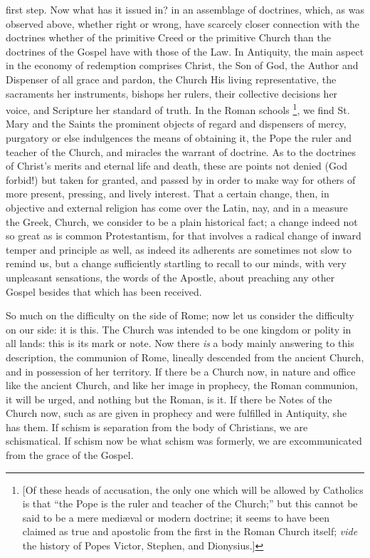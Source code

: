 first step. Now what has it issued in? in an assemblage of doctrines,
which, as was observed above, whether right or wrong, have scarcely
closer connection with the doctrines whether of the primitive Creed or
the primitive Church than the doctrines of the Gospel have with those
of the Law. In Antiquity, the main aspect in the economy of redemption
comprises Christ, the Son of God, the Author and Dispenser of all
grace and pardon, the Church His living representative, the sacraments
her instruments, bishops her rulers, their collective decisions her
voice, and Scripture her standard of truth. In the Roman schools \footnote{[Of these heads of accusation, the only one which will be allowed by
Catholics is that ``the Pope is the ruler and teacher of the Church;''
but this cannot be said to be a mere mediæval or modern doctrine; it
seems to have been claimed as true and apostolic from the first in the
Roman Church itself; \emph{vide} the history of Popes Victor, Stephen,
and Dionysius.]}, we find St. Mary and the Saints the prominent objects of
regard and dispensers of mercy, purgatory or else indulgences the
means of obtaining it, the Pope the ruler and teacher of the Church,
and miracles the warrant of doctrine. As to the doctrines of Christ's
merits and eternal life and death, these are points not denied (God
forbid!) but taken for granted, and passed by in order to make way for
others of more present, pressing, and lively interest. That a certain
change, then, in objective and external religion has come over the
Latin, nay, and in a measure the Greek, Church, we consider to be a
plain historical fact; a change indeed not so great as is common
Protestantism, for that involves a radical change of inward temper and
principle as well, as indeed its adherents are sometimes not slow to
remind us, but a change sufficiently startling to recall to our minds,
with very unpleasant sensations, the words of the Apostle, about
preaching any other Gospel besides that which has been received.

So much on the difficulty on the side of Rome;
now let us consider the difficulty on our side: it is this. The Church
was intended to be one kingdom or polity in all lands: this is its
mark or note. Now there \emph{is} a body mainly answering to this
description, the communion of Rome, lineally descended from the
ancient Church, and in possession of her territory. If there be a
Church now, in nature and office like the ancient Church, and like her
image in prophecy, the Roman communion, it will be urged, and nothing
but the Roman, is it. If there be Notes of the Church now, such as are
given in prophecy and were fulfilled in Antiquity, she has them. If
schism is separation from the body of Christians, we are schismatical.
If schism now be what schism was formerly, we are excommunicated from
the grace of the Gospel.

